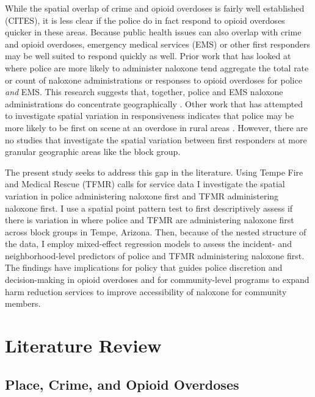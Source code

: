 While the spatial overlap of crime and opioid overdoses is fairly well established (CITES), it is less clear if the police do in fact respond to opioid overdoses quicker in these areas. Because public health issues can also overlap with crime and opioid overdoses, emergency medical services (EMS) or other first responders may be well suited to respond quickly as well. Prior work that has looked at where police are more likely to administer naloxone tend aggregate the total rate or count of naloxone administrations or responses to opioid overdoses for police \textit{and} EMS. This research suggests that, together, police and EMS naloxone administrations do concentrate geographically \parencite{heavey_descriptive_2018}. Other work that has attempted to investigate spatial variation in responsiveness indicates that police may be more likely to be first on scene at an overdose in rural areas \parencite{wood_overdose_2021}. However, there are no studies that investigate the spatial variation between first responders at more granular geographic areas like the block group. 

The present study seeks to address this gap in the literature. Using Tempe Fire and Medical Rescue (TFMR) calls for service data I investigate the spatial variation in police administering naloxone first and TFMR administering naloxone first. I use a spatial point pattern test to first descriptively assess if there is variation in where police and TFMR are administering naloxone first across block groups in Tempe, Arizona. Then, because of the nested structure of the data, I employ mixed-effect regression models to assess the incident- and neighborhood-level predictors of police and TFMR administering naloxone first. The findings have implications for policy that guides police discretion and decision-making in opioid overdoses and for community-level programs to expand harm reduction services to improve accessibility of naloxone for community members.

\section{\centering Literature Review}

\subsection{Place, Crime, and Opioid Overdoses}

